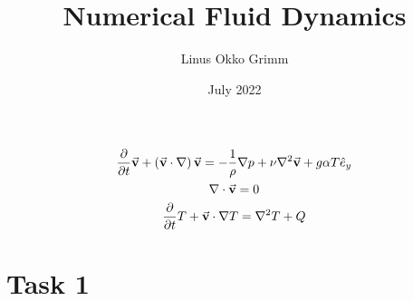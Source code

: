 \documentclass[12pt,a4paper,titlepage,headinclude,bibtotoc]{scrartcl}
\title{Numerical Fluid Dynamics}
\author{Linus Okko Grimm}
\date{July 2022}
\begin{document}
\maketitle

\begin{gather}
    \pdv{}{t}\va{v} + \left(\va{v}\cdot\nabla \right)\va{v} = - \frac{1}{\rho}\nabla p + \nu\nabla^2\va{v} + g \alpha T \hat{e}_y\label{eq_fst}\\
    \nabla \cdot \va{v} = 0\label{eq_snd}\\
    \pdv{}{t} T + \va{v}\cdot\nabla T = \nabla^2 T + Q\label{eq_thrd}
\end{gather}


\section{Task 1}


\end{document}
